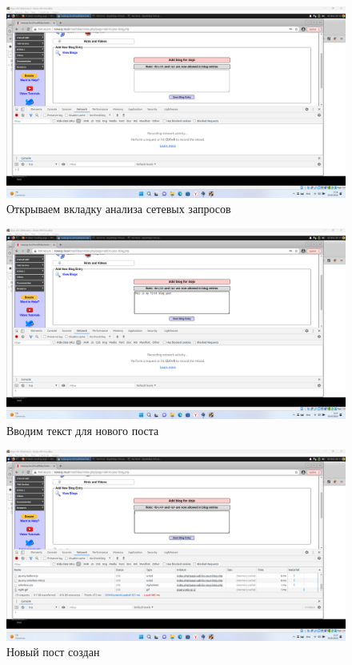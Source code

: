 \documentclass[a4paper]{article}
\begin{document}
  \begin{figure}[H]
    \centering
    \includegraphics[width=\textwidth]{Screenshot_25}
    \caption{Открываем вкладку анализа сетевых запросов}
  \end{figure}

  \begin{figure}[H]
    \centering
    \includegraphics[width=\textwidth]{Screenshot_26}
    \caption{Вводим текст для нового поста}
  \end{figure}

  \begin{figure}[H]
    \centering
    \includegraphics[width=\textwidth]{Screenshot_27}
    \caption{Новый пост создан}
  \end{figure}
\end{document}
